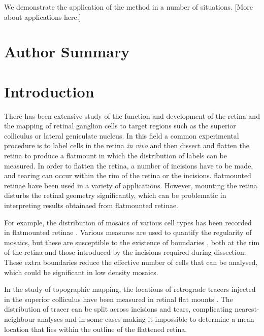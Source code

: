 \documentclass[10pt]{article}
\newcommand{\todo}[1]{{\color{red}[#1]}}
\begin{document}
We demonstrate the application of the method in a number of
situations. \todo{More about applications here.}

\section*{Author Summary}

\section*{Introduction}

There has been extensive study of the function and development of the
retina and the mapping of retinal ganglion cells to target regions
such as the superior colliculus or lateral geniculate nucleus. In this
field a common experimental procedure is to label cells in the retina
\emph{in vivo} and then dissect and flatten the retina to produce a
flatmount in which the distribution of labels can be measured. In
order to flatten the retina, a number of incisions have to be made,
and tearing can occur within the rim of the retina or the incisions.
flatmounted retinae have been used in a variety of
applications. However, mounting the retina disturbs the retinal
geometry significantly, which can be problematic in interpreting
results obtainaed from flatmounted retinae.

For example, the distribution of mosaics of various cell types has
been recorded in flatmounted retinae
\cite{WassBoyc91func,RaveEtal03dete}.  Various measures are used to
quantify the regularity of mosaics, but these are susceptible to the
existence of boundaries \cite{Cook96spat}, both at the rim of the
retina and those introduced by the incisions required during
dissection. These extra boundaries reduce the effective number of
cells that can be analysed, which could be significant in low density
mosaics.

In the study of topographic mapping, the locations of retrograde
tracers injected in the superior colliculus have been measured in
retinal flat mounts \cite{RebeEtal04rela,RashEtal05oppo}. The
distribution of tracer can be split across incisions and tears,
complicating nearest-neighbour analyses and in some cases making it
impossible to determine a mean location that lies within the outline
of the flattened retina.
\end{document}
